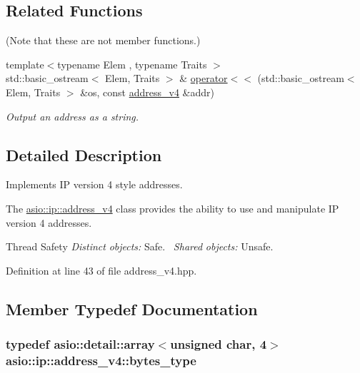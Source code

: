 \subsection*{Related Functions}
(Note that these are not member functions.) \begin{DoxyCompactItemize}
\item 
{\footnotesize template$<$typename Elem , typename Traits $>$ }\\std\+::basic\+\_\+ostream$<$ Elem, Traits $>$ \& \hyperlink{classasio_1_1ip_1_1address__v4_adb437793c8072afdd6cc700224302459}{operator$<$$<$} (std\+::basic\+\_\+ostream$<$ Elem, Traits $>$ \&os, const \hyperlink{classasio_1_1ip_1_1address__v4}{address\+\_\+v4} \&addr)
\begin{DoxyCompactList}\small\item\em Output an address as a string. \end{DoxyCompactList}\end{DoxyCompactItemize}


\subsection{Detailed Description}
Implements I\+P version 4 style addresses. 

The \hyperlink{classasio_1_1ip_1_1address__v4}{asio\+::ip\+::address\+\_\+v4} class provides the ability to use and manipulate I\+P version 4 addresses.

\begin{DoxyParagraph}{Thread Safety}
{\itshape Distinct} {\itshape objects\+:} Safe.~\newline
{\itshape Shared} {\itshape objects\+:} Unsafe. 
\end{DoxyParagraph}


Definition at line 43 of file address\+\_\+v4.\+hpp.



\subsection{Member Typedef Documentation}
\hypertarget{classasio_1_1ip_1_1address__v4_a215b307474a39b561a7dd9be3e7a99ad}{}
\subsubsection[{bytes\+\_\+type}]{\setlength{\rightskip}{0pt plus 5cm}typedef {\bf asio\+::detail\+::array}$<$unsigned char, 4$>$ {\bf asio\+::ip\+::address\+\_\+v4\+::bytes\+\_\+type}}\label{classasio_1_1ip_1_1address__v4_a215b307474a39b561a7dd9be3e7a99ad}



